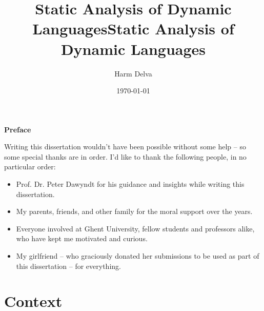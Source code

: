 \documentclass[a4paper, 16pt, oneside]{Thesis}
\title{Static Analysis of Dynamic Languages}
\author{Harm Delva}
\date{}
\begin{document}
\title  {Static Analysis of Dynamic Languages}
\date       {\today}
\subject    {}
\keywords   {}

\maketitle

\cleardoublepage
\thispagestyle{empty}
\begin{center}{\huge\bf Preface}\end{center}
    {\vfill\null}
      Writing this dissertation wouldn't have been possible without some help -- so some special thanks are in order. I'd like to thank the following people, in no particular order:

      \begin{itemize}[label={}]
        \item Prof. Dr. Peter Dawyndt for his guidance and insights while writing this dissertation. 
        \item My parents, friends, and other family for the moral support over the years. 
        \item Everyone involved at Ghent University, fellow students and professors alike, who have kept me motivated and curious. 
        \item My girlfriend --  who graciously donated her submissions to be used as part of this dissertation -- for everything.  
      \end{itemize}
 
    {\vfill\null}

            






\tableofcontents

\hypersetup{
    colorlinks = true,
}

\renewcommand{\thesection}{\thechapter.\arabic{section}} 
\renewcommand{\thesubsection}{\thesection.\arabic{subsection}}

\mainmatter
{}

\chapter{Context}\label{context}
\end{document}

